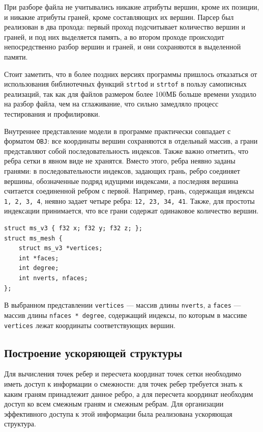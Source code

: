 \documentclass[14pt]{extarticle}
\begin{document}
При разборе файла не учитывались никакие атрибуты вершин, кроме их позиции, и никакие атрибуты граней, кроме составляющих их вершин. Парсер был реализован в два прохода: первый проход подсчитывает количество вершин и граней, и под них выделяется память, а во втором проходе происходит непосредственно разбор вершин и граней, и они сохраняются в выделенной памяти.

Стоит заметить, что в более поздних версиях программы пришлось отказаться от использования библиотечных функций \texttt{strtod} и \texttt{strtof} в пользу самописных реализаций, так как для файлов размером более 100МБ больше времени уходило на разбор файла, чем на сглаживание, что сильно замедляло процесс тестирования и профилировки.

Внутреннее представление модели в программе практически совпадает с форматом \texttt{OBJ}: все координаты вершин сохраняются в отдельный массив, а грани представляют собой последовательность индексов. Также важно отметить, что ребра сетки в явном виде не хранятся. Вместо этого, ребра неявно заданы гранями: в последовательности индексов, задающих грань, ребро соединяет вершины, обозначенные подряд идущими индексами, а последняя вершина считается соединенной ребром с первой. Например, грань, содержащая индексы \texttt{1, 2, 3, 4}, неявно задает четыре ребра: \texttt{12, 23, 34, 41}. Также, для простоты индексации принимается, что все грани содержат одинаковое количество вершин.

\begin{lstlisting}[caption={Структура внутреннего представления сетки}, captionpos=b]
struct ms_v3 { f32 x; f32 y; f32 z; };
struct ms_mesh {
    struct ms_v3 *vertices;
    int *faces;
    int degree;
    int nverts, nfaces;
};
\end{lstlisting}

В выбранном представлении \texttt{vertices} --- массив длины \texttt{nverts}, а \texttt{faces} --- массив длины \texttt{nfaces * degree}, содержащий индексы, по которым в массиве \texttt{vertices} лежат координаты соответствующих вершин.

\subsection{Построение ускоряющей структуры}
Для вычисления точек ребер и пересчета координат точек сетки необходимо иметь доступ к информации о смежности: для точек ребер требуется знать к каким граням принадлежит данное ребро, а для пересчета координат необходим доступ ко всем смежным граням и смежным ребрам. Для организации эффективного доступа к этой информации была реализована ускоряющая структура.
\end{document}
